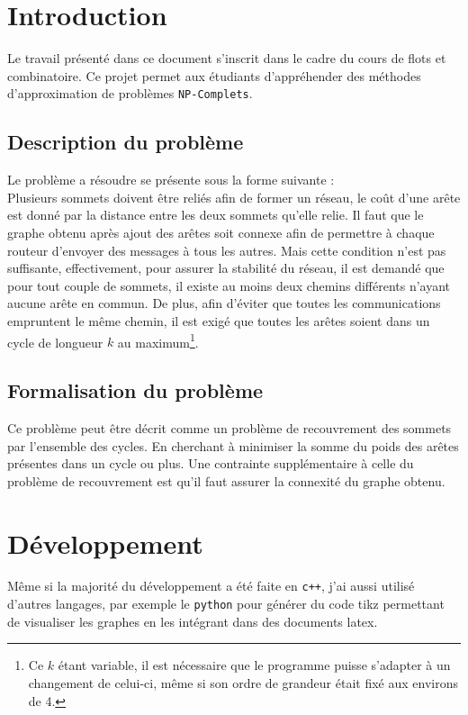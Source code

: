 \documentclass[a4paper,12pt]{article}
\begin{document}
\tableofcontents
\pagebreak

\section{Introduction}
Le travail présenté dans ce document s'inscrit dans le cadre du cours de
flots et combinatoire. Ce projet permet aux étudiants d'appréhender des
méthodes d'approximation de problèmes \verb!NP-Complets!.\\

\subsection{Description du problème}
Le problème a résoudre se présente sous la forme suivante :\\
Plusieurs sommets doivent être reliés afin de former un réseau, le coût d'une
arête est donné par la distance entre les deux sommets qu'elle relie. Il faut
que le graphe obtenu après ajout des arêtes soit connexe afin de permettre
à chaque routeur d'envoyer des messages à tous les autres. Mais cette
condition n'est pas suffisante, effectivement, pour assurer la stabilité du
réseau, il est demandé que pour tout couple de sommets, il existe au moins
deux chemins différents n'ayant aucune arête en commun. De plus, afin
d'éviter que toutes les communications empruntent le même chemin, il est
exigé que toutes les arêtes soient dans un cycle de longueur $k$ au
maximum\footnote{Ce $k$ étant variable, il est nécessaire que le programme
puisse s'adapter à un changement de celui-ci, même si son ordre de grandeur
était fixé aux environs de 4.}.

\subsection{Formalisation du problème}
Ce problème peut être décrit comme un problème de recouvrement des sommets par
l'ensemble des cycles. En cherchant à minimiser la somme du poids des arêtes
présentes dans un cycle ou plus. Une contrainte supplémentaire à celle du
problème de recouvrement est qu'il faut assurer la connexité du graphe obtenu.

\section{Développement}

Même si la majorité du développement a été faite en \verb!c++!, j'ai aussi
utilisé d'autres langages, par exemple le \verb!python! pour générer du code
tikz permettant de visualiser les graphes en les intégrant dans des documents
latex.
\end{document}
